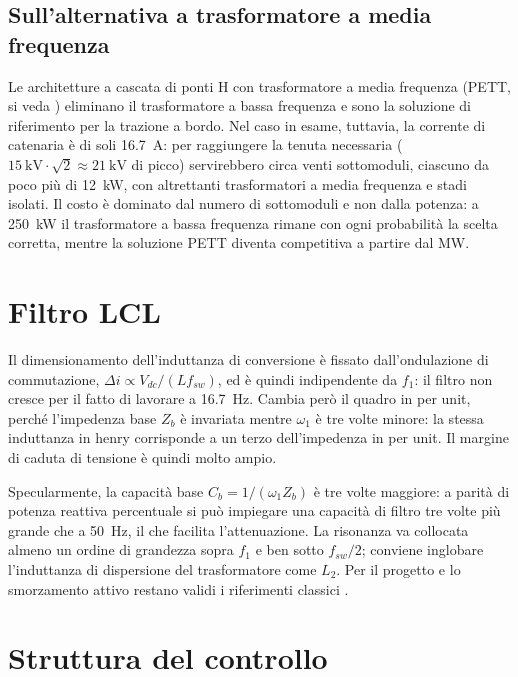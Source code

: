 \subsection{Sull'alternativa a trasformatore a media frequenza}

Le architetture a cascata di ponti H con trasformatore a media frequenza (PETT, si veda
\cite{steiner2007,zhao2014}) eliminano il trasformatore a bassa frequenza e sono la
soluzione di riferimento per la trazione a bordo. Nel caso in esame, tuttavia, la
corrente di catenaria è di soli \SI{16.7}{\ampere}: per raggiungere la tenuta necessaria
($\SI{15}{\kilo\volt}\cdot\sqrt{2}\approx\SI{21}{\kilo\volt}$ di picco) servirebbero
circa venti sottomoduli, ciascuno da poco più di \SI{12}{\kilo\watt}, con altrettanti
trasformatori a media frequenza e stadi isolati. Il costo è dominato dal numero di
sottomoduli e non dalla potenza: a \SI{250}{\kilo\watt} il trasformatore a bassa
frequenza rimane con ogni probabilità la scelta corretta, mentre la soluzione PETT
diventa competitiva a partire dal \si{\mega\watt}.

\section{Filtro LCL}

Il dimensionamento dell'induttanza di conversione è fissato dall'ondulazione di
commutazione, $\Delta i \propto V_{dc}/(L f_{sw})$, ed è quindi indipendente da $f_1$: il
filtro non cresce per il fatto di lavorare a \SI{16.7}{\hertz}. Cambia però il quadro in
per unit, perché l'impedenza base $Z_b$ è invariata mentre $\omega_1$ è tre volte minore:
la stessa induttanza in henry corrisponde a un terzo dell'impedenza in per unit. Il
margine di caduta di tensione è quindi molto ampio.

Specularmente, la capacità base $C_b = 1/(\omega_1 Z_b)$ è tre volte maggiore: a parità di
potenza reattiva percentuale si può impiegare una capacità di filtro tre volte più grande
che a \SI{50}{\hertz}, il che facilita l'attenuazione. La risonanza va collocata almeno
un ordine di grandezza sopra $f_1$ e ben sotto $f_{sw}/2$; conviene inglobare
l'induttanza di dispersione del trasformatore come $L_2$. Per il progetto e lo smorzamento
attivo restano validi i riferimenti classici \cite{liserre2005,pan2014}.

\section{Struttura del controllo}


